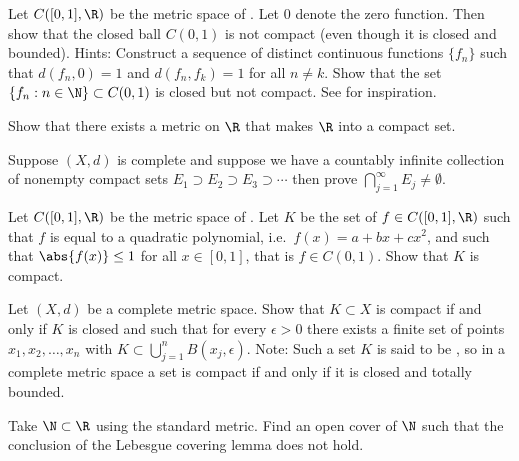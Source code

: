 \documentclass[12pt]{book}
\begin{document}
\begin{exercise}[Challenging] \label{exercise:msclbounnotcompt}
Let $C([0,1],\R)$ be the metric space of .
Let $0$
denote the zero function.
Then show that the closed ball
$C(0,1)$ is not compact (even though it is closed and bounded).
Hints: Construct a sequence of distinct continuous functions $\{ f_n \}$ such that
$d(f_n,0) = 1$ and $d(f_n,f_k) = 1$ for all $n \not= k$.
Show that
the set $\{ f_n : n \in \N \} \subset C(0,1)$ is closed but not compact.
See  for inspiration.
\end{exercise}

\begin{exercise}[Challenging]
Show that there exists a metric on $\R$ that makes $\R$ into a compact set.
\end{exercise}

\begin{exercise}
Suppose $(X,d)$ is complete and suppose we have a countably infinite
collection of nonempty compact sets $E_1 \supset E_2 \supset E_3 \supset
\cdots$ then prove $\bigcap_{j=1}^\infty E_j \not= \emptyset$.
\end{exercise}

\begin{exercise}[Challenging]
Let $C([0,1],\R)$ be the metric space of .
Let $K$ be the set of $f \in C([0,1],\R)$ such that
$f$ is equal to a quadratic polynomial, i.e.\ $f(x) = a+bx+cx^2$, and such that
$\abs{f(x)} \leq 1$ for all $x \in [0,1]$,
that is $f \in C(0,1)$.
Show that $K$ is compact.
\end{exercise}

\begin{exercise}[Challenging] \label{exercise:mstotbound}
Let $(X,d)$ be a complete metric space.
Show that $K \subset X$ is compact if and only if $K$ is closed
and such that for every $\epsilon > 0$
there exists a finite set of points $x_1,x_2,\ldots,x_n$ with
$K \subset \bigcup_{j=1}^n B(x_j,\epsilon)$.
Note: Such a set $K$ is said to be \emph{},
so in a complete metric space a set is compact if and only
if it is closed and totally bounded.
\end{exercise}

\begin{exercise}
Take $\N \subset \R$ using the standard metric.
Find an open cover of $\N$
such that the conclusion of the Lebesgue covering lemma does not hold.
\end{exercise}
\end{document}
